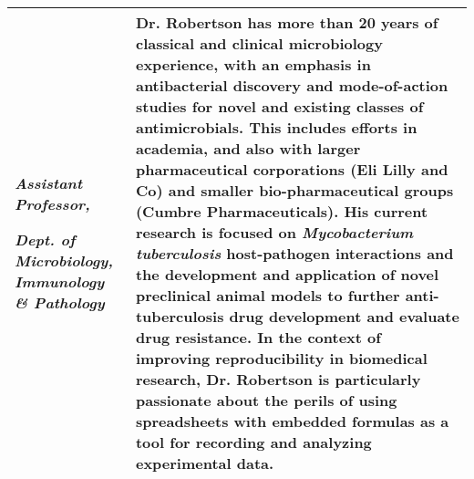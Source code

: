 \begin{table}[!h]
{\begin{tabular}[t]{>{\raggedright\arraybackslash}p{14em}>{\raggedright\arraybackslash}p{45em}}
  \textit{Assistant Professor,}
  
  \textit{Dept. of Microbiology, Immunology \& Pathology} & Dr. Robertson has more than 20 years of classical and clinical microbiology
  experience, with an emphasis in antibacterial discovery and mode-of-action studies
  for novel and existing classes of antimicrobials. This includes efforts in
  academia, and also with larger pharmaceutical corporations (Eli Lilly and Co)
  and smaller bio-pharmaceutical groups (Cumbre Pharmaceuticals). His current
  research is focused on \textit{Mycobacterium tuberculosis} host-pathogen
  interactions and the development and application of novel preclinical animal
  models to further anti-tuberculosis drug development and evaluate drug
  resistance. In the context of improving reproducibility in biomedical research,
  Dr. Robertson is particularly passionate about the perils of using spreadsheets
  with embedded formulas as a tool for recording and analyzing experimental data.\\
\bottomrule
\end{tabular}}
\end{table}

